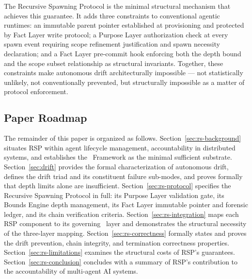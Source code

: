 The Recursive Spawning Protocol is the minimal structural mechanism that achieves this guarantee. It adds three constraints to conventional agentic runtimes: an immutable parent pointer established at provisioning and protected by Fact Layer write protocol; a Purpose Layer authorization check at every spawn event requiring scope refinement justification and spawn necessity declaration; and a Fact Layer pre-commit hook enforcing both the depth bound and the scope subset relationship as structural invariants. Together, these constraints make autonomous drift architecturally impossible --- not statistically unlikely, not conventionally prevented, but structurally impossible as a matter of protocol enforcement.

\subsection{Paper Roadmap}

The remainder of this paper is organized as follows. Section~\ref{sec:rs-background} situates RSP within agent lifecycle management, accountability in distributed systems, and establishes the \bxthree\ Framework as the minimal sufficient substrate. Section~\ref{sec:drift} provides the formal characterization of autonomous drift, defines the drift triad and its constituent failure sub-modes, and proves formally that depth limits alone are insufficient. Section~\ref{sec:rs-protocol} specifies the Recursive Spawning Protocol in full: its Purpose Layer validation gate, its Bounds Engine depth management, its Fact Layer immutable pointer and forensic ledger, and its chain verification criteria. Section~\ref{sec:rs-integration} maps each RSP component to its governing \bxthree\ layer and demonstrates the structural necessity of the three-layer mapping. Section~\ref{sec:rs-correctness} formally states and proves the drift prevention, chain integrity, and termination correctness properties. Section~\ref{sec:rs-limitations} examines the structural costs of RSP's guarantees. Section~\ref{sec:rs-conclusion} concludes with a summary of RSP's contribution to the accountability of multi-agent AI systems.
